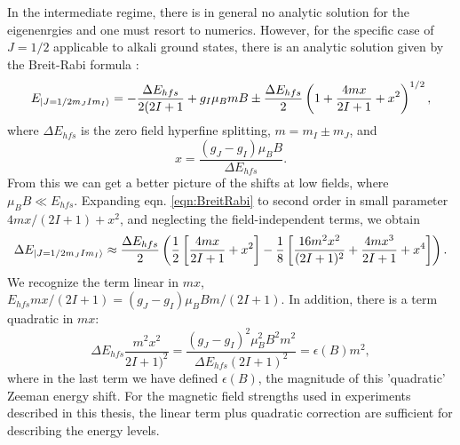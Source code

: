 In the intermediate regime, there is in general no analytic solution for the eigenenrgies and one must resort to numerics. However, for the specific case of $J=1/2$ applicable to alkali ground states, there is an analytic solution given by the Breit-Rabi formula \cite{BreitRabi}:
\begin{equation}
E_{\mathinner{|{J=1/2 m_J I m_I}\rangle}} = - \frac{\Delta E_{hfs}}{2(2I+1}+g_I \mu_B m B \pm \frac{\Delta E_{hfs}}{2}\left(1+\frac{4mx}{2I+1}+x^2\right)^{1/2},
\label{eqn:BreitRabi}
\end{equation}
where $\Delta E_{hfs}$ is the zero field hyperfine splitting, $m=m_I\pm m_J$, and
\begin{equation}
x=\frac{(g_J - g_I)\mu_B B}{\Delta E_{hfs}}.
\end{equation}
From this we can get a better picture of the shifts at low fields, where $\mu_B B\ll E_{hfs}$. Expanding eqn. \ref{eqn:BreitRabi} to second order in small parameter $4mx/(2I+1)+x^2$, and neglecting the field-independent terms, we obtain
\begin{equation}
\Delta E_{\mathinner{|{J=1/2 m_J I m_I}\rangle}}\approx \frac{\Delta E_{hfs}}{2}\left(\frac{1}{2}\left[\frac{4mx}{2I+1}+x^2\right]-\frac{1}{8}\left[\frac{16m^2 x^2}{(2I+1)^2} +\frac{4mx^3}{2I+1}+x^4\right]\right).
\end{equation}
We recognize the term linear in $mx$,  $E_{hfs}mx/(2I+1) = (g_J-g_I)\mu_B B m/(2I+1)$. In addition, there is a term quadratic in $mx$:
\begin{equation}
\Delta E_{hfs} \frac{m^2x^2}{2I+1)^2} = \frac{(g_J-g_I)^2 \mu_B^2 B^2 m^2}{\Delta E_{hfs} (2I+1)^2} = \epsilon(B) m^2,
\end{equation}
where in the last term we have defined $\epsilon(B)$, the magnitude of this 'quadratic' Zeeman energy shift. For the magnetic field strengths used in experiments described in this thesis, the linear term plus quadratic correction are sufficient for describing the energy levels.
%
%	

